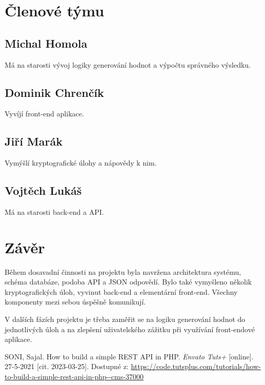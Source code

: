 \documentclass[titlepage]{article}
\begin{document}
\section{Členové týmu}
\subsection*{Michal Homola}
Má na starosti vývoj logiky generování hodnot a výpočtu správného výsledku.
\subsection*{Dominik Chrenčík}
Vyvíjí front-end aplikace.
\subsection*{Jiří Marák}
Vymýšlí kryptografické úlohy a nápovědy k nim.
\subsection*{Vojtěch Lukáš}
Má na starosti back-end a API. 

\section*{Závěr}
Během dosavadní činnosti na projektu byla navržena architektura systému, schéma databáze, podoba API a JSON odpovědí. Bylo také vymyšleno několik kryptografických úloh, vyvinut back-end a elementární front-end. Všechny komponenty mezi sebou úspěšně komunikují.

V dalších fázích projektu je třeba zaměřit se na logiku generování hodnot do jednotlivých úloh a na zlepšení uživatelského zážitku při využívání front-endové aplikace. 



\begin{thebibliography}{9}
    SONI, Sajal. How to build a simple REST API in PHP. \emph{En\-va\-to Tuts+} [on\-li\-ne]. 27-5-2021 [cit. 2023-03-25]. Dostupné z: \url{https://code.tutsplus.com/tutorials/how-to-build-a-simple-rest-api-in-php--cms-37000}
\end{thebibliography}
\end{document}
